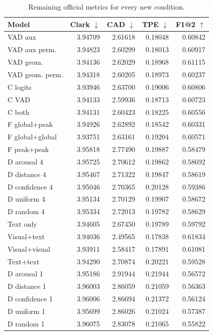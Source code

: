 \begingroup\footnotesize\setlength{\tabcolsep}{4pt}
\begin{longtable}{lrrrr}
\caption{Remaining official metrics for every new condition.}\\
\toprule
Model & Clark $\downarrow$ & CAD $\downarrow$ & TPE $\downarrow$ & F1@2 $\uparrow$\\\midrule\endhead
VAD aux & 3.94709 & 2.61618 & 0.18048 & 0.60842\\
VAD aux perm. & 3.94823 & 2.60299 & 0.18013 & 0.60917\\
VAD geom. & 3.94136 & 2.62029 & 0.18968 & 0.61115\\
VAD geom. perm. & 3.94318 & 2.60205 & 0.18973 & 0.60237\\
C logits & 3.93946 & 2.63700 & 0.19006 & 0.60806\\
C VAD & 3.94133 & 2.59936 & 0.18713 & 0.60723\\
C both & 3.94131 & 2.60423 & 0.18225 & 0.60556\\
F global+peak & 3.94926 & 2.62892 & 0.18542 & 0.60331\\
F global+global & 3.93751 & 2.63161 & 0.19204 & 0.60571\\
F peak+peak & 3.95818 & 2.77490 & 0.19887 & 0.58479\\
D arousal 4 & 3.95725 & 2.70612 & 0.19862 & 0.58692\\
D distance 4 & 3.95467 & 2.71322 & 0.19847 & 0.58619\\
D confidence 4 & 3.95046 & 2.70365 & 0.20128 & 0.59386\\
D uniform 4 & 3.95134 & 2.70129 & 0.19907 & 0.58672\\
D random 4 & 3.95334 & 2.72013 & 0.19782 & 0.58629\\
Text only & 3.94605 & 2.67450 & 0.19789 & 0.59792\\
Visual+text & 3.94036 & 2.49565 & 0.17838 & 0.61834\\
Visual+visual & 3.93911 & 2.58417 & 0.17891 & 0.61081\\
Text+text & 3.94290 & 2.70874 & 0.20221 & 0.59528\\
D arousal 1 & 3.95186 & 2.91944 & 0.21944 & 0.56572\\
D distance 1 & 3.96003 & 2.86059 & 0.21059 & 0.56363\\
D confidence 1 & 3.96006 & 2.86694 & 0.21372 & 0.56124\\
D uniform 1 & 3.95699 & 2.86026 & 0.21024 & 0.57387\\
D random 1 & 3.96075 & 2.83078 & 0.21065 & 0.55822\\

\end{longtable}
